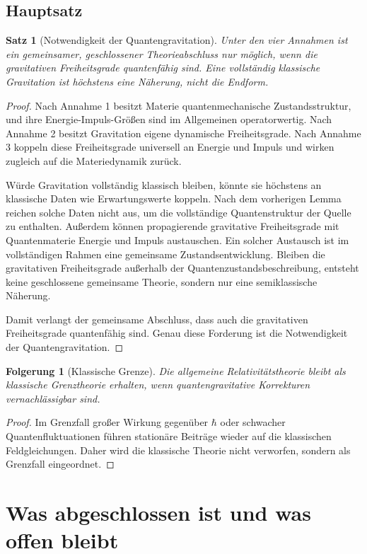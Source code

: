 \documentclass[11pt,a4paper,openany]{book}
\newtheorem{satz}{Satz}[chapter]
\newtheorem{korollar}{Folgerung}[chapter]
\theoremstyle{remark}
\begin{document}
\section{Hauptsatz}
\begin{satz}[Notwendigkeit der Quantengravitation]
Unter den vier Annahmen ist ein gemeinsamer, geschlossener Theorieabschluss nur möglich, wenn die gravitativen Freiheitsgrade quantenfähig sind. Eine vollständig klassische Gravitation ist höchstens eine Näherung, nicht die Endform.
\end{satz}
\begin{proof}
Nach Annahme 1 besitzt Materie quantenmechanische Zustandsstruktur, und ihre Energie-Impuls-Größen sind im Allgemeinen operatorwertig. Nach Annahme 2 besitzt Gravitation eigene dynamische Freiheitsgrade. Nach Annahme 3 koppeln diese Freiheitsgrade universell an Energie und Impuls und wirken zugleich auf die Materiedynamik zurück.

Würde Gravitation vollständig klassisch bleiben, könnte sie höchstens an klassische Daten wie Erwartungswerte koppeln. Nach dem vorherigen Lemma reichen solche Daten nicht aus, um die vollständige Quantenstruktur der Quelle zu enthalten. Außerdem können propagierende gravitative Freiheitsgrade mit Quantenmaterie Energie und Impuls austauschen. Ein solcher Austausch ist im vollständigen Rahmen eine gemeinsame Zustandsentwicklung. Bleiben die gravitativen Freiheitsgrade außerhalb der Quantenzustandsbeschreibung, entsteht keine geschlossene gemeinsame Theorie, sondern nur eine semiklassische Näherung.

Damit verlangt der gemeinsame Abschluss, dass auch die gravitativen Freiheitsgrade quantenfähig sind. Genau diese Forderung ist die Notwendigkeit der Quantengravitation.
\end{proof}

\begin{korollar}[Klassische Grenze]
Die allgemeine Relativitätstheorie bleibt als klassische Grenztheorie erhalten, wenn quantengravitative Korrekturen vernachlässigbar sind.
\end{korollar}
\begin{proof}
Im Grenzfall großer Wirkung gegenüber $\hbar$ oder schwacher Quantenfluktuationen führen stationäre Beiträge wieder auf die klassischen Feldgleichungen. Daher wird die klassische Theorie nicht verworfen, sondern als Grenzfall eingeordnet.
\end{proof}

\chapter{Was abgeschlossen ist und was offen bleibt}
\end{document}
